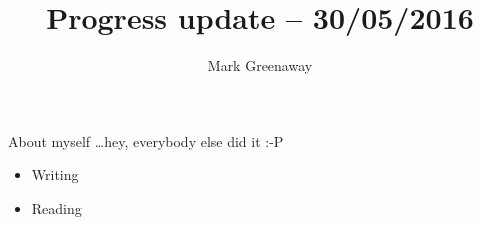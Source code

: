 \documentclass{beamer}
\title{Progress update -- 30/05/2016}
\author{Mark Greenaway}
\begin{document}
\begin{frame}
\titlepage
\end{frame}

\begin{frame}{About myself \ldots hey, everybody else did it :-P}
\begin{itemize}
\item Writing
\item Reading
\end{itemize}
\end{frame}
\end{document}
